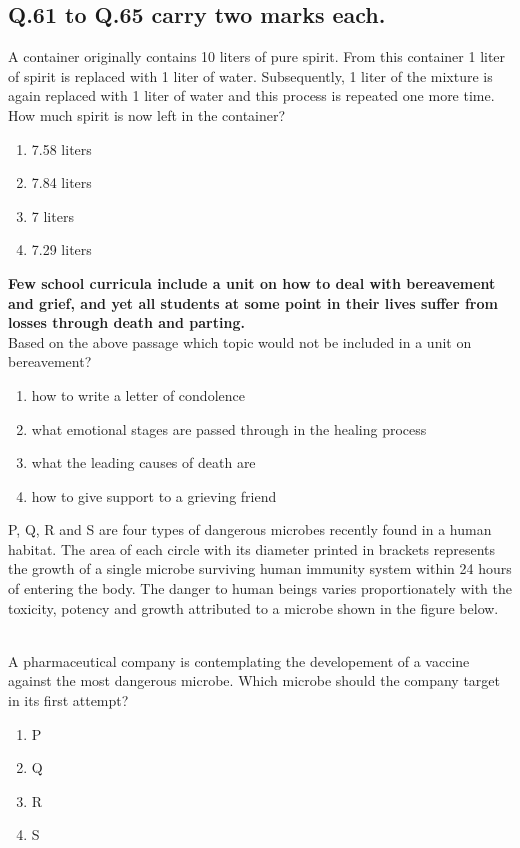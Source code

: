 \subsection*{\textbf{Q.61 to Q.65 carry two marks each.}}
\item A container originally contains 10 liters of pure spirit. From this container 1 liter of spirit is replaced with 1 liter of water. Subsequently, 1 liter of the mixture is again replaced with 1 liter of water and this process is repeated one more time. How much spirit is now left in the container?
\begin{enumerate}
    \item 7.58 liters
    \item 7.84 liters
    \item 7 liters
    \item 7.29 liters
\end{enumerate}
\item \textbf{Few school curricula include a unit on how to deal with bereavement and grief, and yet all students at some point in their lives suffer from losses through death and parting.} \\ Based on the above passage which topic would not be included in a unit on bereavement?
\begin{enumerate}
    \item how to write a letter of condolence
    \item what emotional stages are passed through in the healing process
    \item what the leading causes of death are
    \item how to give support to a grieving friend
\end{enumerate}
\item  P, Q, R and S are four types of dangerous microbes recently found in a human habitat. The area of each circle with its diameter printed in brackets represents the growth of a single microbe surviving human immunity system within 24 hours of entering the body. The danger to human beings varies proportionately with the toxicity, potency and growth attributed to a microbe shown in the figure below.
	
\\
A pharmaceutical company is contemplating the developement of a vaccine against the most dangerous microbe. Which microbe should the company target in its first attempt?
\begin{enumerate}
    \item P
    \item Q
    \item R
    \item S
\end{enumerate}
